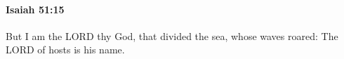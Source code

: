 
		\paragraph{Isaiah 51:15} %
			\label{ISAIAH-51-15}

			But I am the LORD thy God, that divided the sea, whose waves roared: The LORD of hosts is his name.


